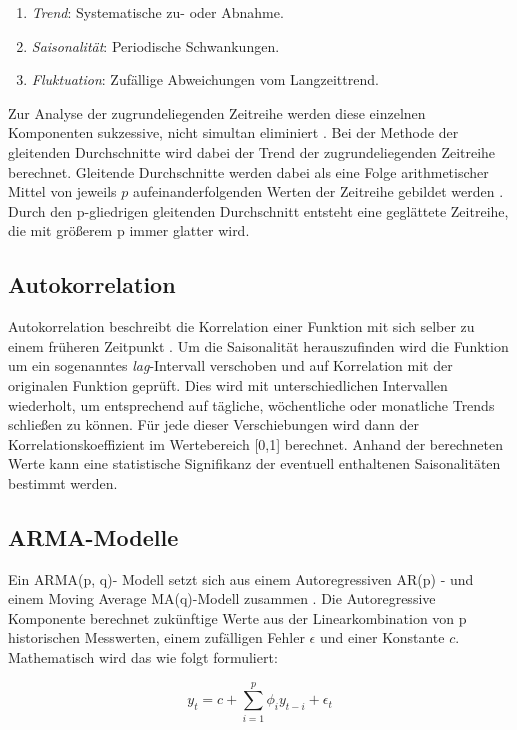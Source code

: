 \documentclass[
ngerman          %
,a4paper          %
,11pt
,pdftex
]{report}
\begin{document}
\begin{enumerate}
	\item \textit{Trend}: Systematische zu- oder Abnahme.
	\item \textit{Saisonalität}: Periodische Schwankungen.
	\item \textit{Fluktuation}: Zufällige Abweichungen vom Langzeittrend.
\end{enumerate}
Zur Analyse der zugrundeliegenden Zeitreihe werden diese einzelnen Komponenten sukzessive, nicht simultan eliminiert \cite[397]{lippe}. Bei der Methode der gleitenden Durchschnitte wird dabei der Trend der zugrundeliegenden Zeitreihe berechnet. Gleitende Durchschnitte werden dabei als eine Folge arithmetischer Mittel von jeweils $p$ aufeinanderfolgenden Werten der Zeitreihe gebildet werden \cite[403]{lippe}. Durch den p-gliedrigen gleitenden Durchschnitt entsteht eine geglättete Zeitreihe, die mit größerem p immer glatter wird. 

\subsection{Autokorrelation} \label{autokorr}
Autokorrelation beschreibt die Korrelation einer Funktion mit sich selber zu einem früheren Zeitpunkt \cite[155]{thinkstats}. Um die Saisonalität herauszufinden wird die Funktion um ein sogenanntes \textit{lag}-Intervall verschoben und auf Korrelation mit der originalen Funktion geprüft. Dies wird mit unterschiedlichen Intervallen wiederholt, um entsprechend auf tägliche, wöchentliche oder monatliche Trends schließen zu können. Für jede dieser Verschiebungen wird dann der Korrelationskoeffizient im Wertebereich [0,1] berechnet. Anhand der berechneten Werte kann eine statistische Signifikanz der eventuell enthaltenen Saisonalitäten bestimmt werden.

\subsection{\acf{ARMA}-Modelle}
Ein \ac{ARMA}(p, q)- Modell setzt sich aus einem Autoregressiven AR(p) - und einem Moving Average MA(q)-Modell zusammen \cite[18]{timeseries}. Die Autoregressive Komponente berechnet zukünftige Werte aus der Linearkombination von p historischen Messwerten, einem zufälligen Fehler $\epsilon$ und einer Konstante $c$. Mathematisch wird das wie folgt formuliert:

\begin{equation}
	y_t = c + \sum_{i=1}^{p}\phi_i y_{t-i} + \epsilon_t
\end{equation}
\end{document}
